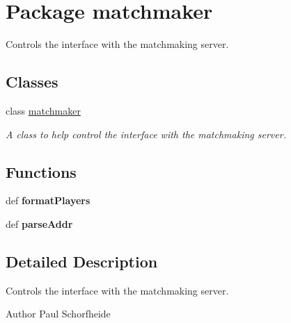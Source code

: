 \hypertarget{namespacematchmaker}{
\section{Package matchmaker}
\label{namespacematchmaker}
}


Controls the interface with the matchmaking server.  


\subsection*{Classes}
\begin{DoxyCompactItemize}
\item 
class \hyperlink{classmatchmaker_1_1matchmaker}{matchmaker}
\begin{DoxyCompactList}\small\item\em A class to help control the interface with the matchmaking server. \item\end{DoxyCompactList}\end{DoxyCompactItemize}
\subsection*{Functions}
\begin{DoxyCompactItemize}
\item 
\hypertarget{namespacematchmaker_a529e2fe2ac3af32f28eedebf14ce6bc3}{
def {\bfseries formatPlayers}}
\label{namespacematchmaker_a529e2fe2ac3af32f28eedebf14ce6bc3}

\item 
\hypertarget{namespacematchmaker_a824a0fff68cb20b4842f2f1d30a2e0bf}{
def {\bfseries parseAddr}}
\label{namespacematchmaker_a824a0fff68cb20b4842f2f1d30a2e0bf}

\end{DoxyCompactItemize}


\subsection{Detailed Description}
Controls the interface with the matchmaking server. \begin{DoxyAuthor}{Author}
Paul Schorfheide 
\end{DoxyAuthor}
